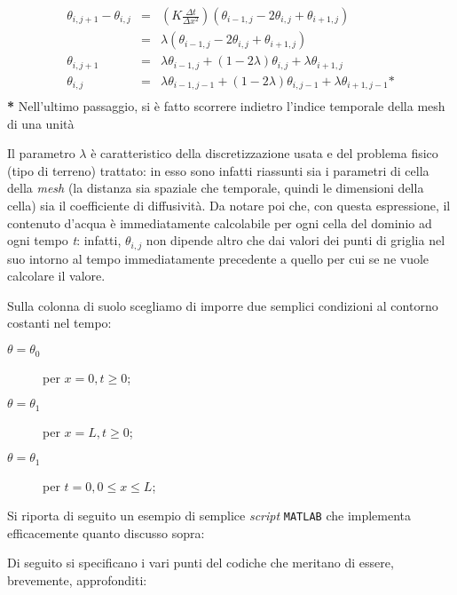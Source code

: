 \documentclass[11pt]{amsart}
\theoremstyle{definition}
\theoremstyle{remark}
\numberwithin{equation}{section}
\begin{document}
\begin{equation}
\label{eq:rich_sim_discr_lambda}
\begin{align}
\theta_{i,j+1}-\theta_{i,j} & = & (K\frac{\Delta t}{\Delta x^{2}})(\theta_{i-1,j} - 2\theta_{i,j} + \theta_{i+1,j}) \\
			    & = &  \lambda (\theta_{i-1,j} - 2\theta_{i,j} + \theta_{i+1,j}) \\
\theta_{i,j+1}		    & = &  \lambda\theta_{i-1,j}  +(1-2\lambda)\theta_{i,j} +\lambda\theta_{i+1,j}\\    
\theta_{i,j}		    & = &  \lambda\theta_{i-1,j-1}  +(1-2\lambda)\theta_{i,j-1} +\lambda\theta_{i+1,j-1} \mathbf{*}\\    
\end{align}
\end{equation}
\footnotesize{\textbf{*} Nell'ultimo passaggio, si è fatto scorrere indietro l'indice temporale della mesh di una unità}
\normalsize
\newline

Il parametro $\lambda$ è caratteristico della discretizzazione usata e del problema fisico (tipo di terreno) trattato: in esso sono infatti riassunti 
sia i parametri di cella della \emph{mesh} (la distanza sia spaziale che temporale, quindi le dimensioni della cella) sia il coefficiente di diffusività.
Da notare poi che, con questa espressione, il contenuto d'acqua è immediatamente calcolabile per ogni cella del dominio ad ogni tempo \emph{t}: infatti,
$\theta_{i,j}$ non dipende altro che dai valori dei punti di griglia nel suo intorno al tempo immediatamente precedente a quello per cui se ne vuole calcolare il
valore.

Sulla colonna di suolo scegliamo di imporre due semplici condizioni al contorno costanti nel tempo:
\begin{description}
\item[$\theta=\theta_{0}$] per $x=0, t\geq0$;
\item[$\theta=\theta_{1}$] per $x=L, t\geq0$; 
\item[$\theta=\theta_{1}$] per $t=0, 0\leq x\leq L$; 
\end{description}

Si riporta di seguito un esempio di semplice \emph{script} \texttt{MATLAB} che implementa efficacemente quanto discusso sopra:



Di seguito si specificano i vari punti del codiche che meritano di essere, brevemente, approfonditi:
\end{document}
